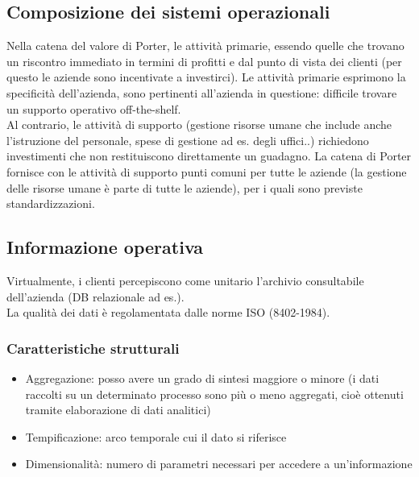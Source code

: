\subsection{Composizione dei sistemi operazionali}
\label{sub:Composizione dei sistemi operazionali}
Nella catena del valore di Porter, le attivit\`a primarie, essendo quelle che
trovano un riscontro immediato in termini di profitti e dal punto di vista dei clienti
(per questo le aziende sono incentivate a investirci).
Le attivit\`a primarie esprimono la specificit\`a dell'azienda, sono
pertinenti all'azienda in questione: difficile trovare un supporto operativo off-the-shelf.\\
Al contrario, le attivit\`a di supporto (gestione risorse umane che include anche l'istruzione
del personale, spese di gestione ad es. degli uffici..) richiedono investimenti che non
restituiscono direttamente un guadagno.
La catena di Porter fornisce con le attivit\`a di supporto punti comuni per tutte le aziende (la gestione
delle risorse umane \`e parte di tutte le aziende), per i quali sono previste
standardizzazioni.
\subsection{Informazione operativa}
\label{sub:Informazione operativa}
Virtualmente, i clienti percepiscono come unitario l'archivio consultabile
dell'azienda (DB relazionale ad es.).\\
La qualit\`a dei dati \`e regolamentata dalle norme ISO (8402-1984).
\subsubsection{Caratteristiche strutturali}
\label{subs:Caratteristiche strutturali}
\begin{itemize}
  \item Aggregazione: posso avere un grado di sintesi maggiore o minore
  (i dati raccolti su un determinato processo sono pi\`u o meno aggregati,
  cio\`e ottenuti tramite elaborazione di dati analitici)
  \item Tempificazione: arco temporale cui il dato si riferisce
  \item Dimensionalit\`a: numero di parametri necessari per accedere
  a un'informazione
\end{itemize}

